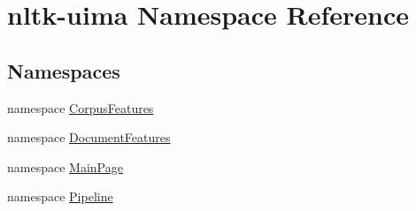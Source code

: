 \hypertarget{namespacenltk-uima}{\section{nltk-\/uima \-Namespace \-Reference}
\label{namespacenltk-uima}
}
\subsection*{\-Namespaces}
\begin{DoxyCompactItemize}
\item 
namespace \hyperlink{namespacenltk-uima_1_1CorpusFeatures}{\-Corpus\-Features}
\item 
namespace \hyperlink{namespacenltk-uima_1_1DocumentFeatures}{\-Document\-Features}
\item 
namespace \hyperlink{namespacenltk-uima_1_1MainPage}{\-Main\-Page}
\item 
namespace \hyperlink{namespacenltk-uima_1_1Pipeline}{\-Pipeline}
\end{DoxyCompactItemize}
